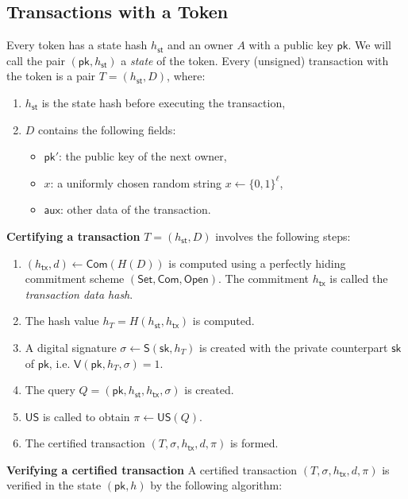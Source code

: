 \documentclass{article}
\newcommand{\sig}[0]{\mathsf{S}}
\newcommand{\pubkey}[0]{\mathsf{pk}}
\newcommand{\prikey}[0]{\mathsf{sk}}
\newcommand{\setup}[0]{\mathsf{Set}}
\newcommand{\commit}[0]{\mathsf{Com}}
\newcommand{\open}[0]{\mathsf{Open}}
\newcommand{\unisrv}[0]{\mathsf{US}}
\newcommand{\sthash}[0]{h_\mathsf{st}}
\newcommand{\txhash}[0]{h_\mathsf{tx}}
\newcommand{\auxd}[0]{\mathsf{aux}}
\begin{document}
\subsection{Transactions with a Token}

Every token has a state hash $\sthash$ and an owner $A$ with a public key $\pubkey$. We will call the pair $(\pubkey, \sthash)$ a \emph{state} of the token.
Every (unsigned) transaction with the token is a pair
$T = (\sthash, D)$, where:
\begin{enumerate}
\item $\sthash$ is the state hash before executing the transaction,
\item $D$ contains the following fields:
\begin{itemize}
\item $\pubkey'$: the public key of the next owner,
\item $x$: a uniformly chosen random string $x\gets\{0,1\}^\ell$,
\item $\auxd$: other data of the transaction.
\end{itemize}
\end{enumerate}

\noindent\textbf{Certifying a transaction} $T = (\sthash, D)$ involves the following steps:
\begin{enumerate}
\item $(\txhash,d) \gets \commit(H(D))$ is computed using a perfectly hiding commitment scheme $(\setup,\commit,\open)$.
The commitment $\txhash$ is called the \emph{transaction data hash}.
\item The hash value $h_T = H(\sthash, \txhash)$ is computed.
\item A digital signature $\sigma \gets \sig(\prikey, h_T)$ is created with the private counterpart $\prikey$ of $\pubkey$, i.e. $\mathsf{V}(\pubkey, h_T, \sigma) = 1$.
\item The query $Q = (\pubkey,\sthash,\txhash,\sigma)$ is created.
\item $\unisrv$ is called to obtain $\pi\gets \unisrv(Q)$.
\item The certified transaction $(T,\sigma,\txhash,d,\pi)$ is formed.
\end{enumerate}

\noindent\textbf{Verifying a certified transaction} A certified transaction $(T,\sigma,\txhash,d,\pi)$ is verified in the state $(\pubkey,h)$ by the following algorithm:\medskip
\end{document}
